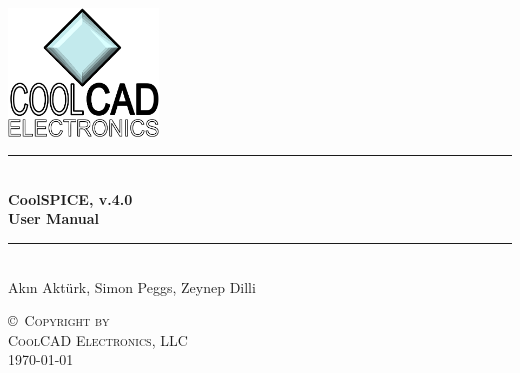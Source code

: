 \begin{titlepage}

\newcommand{\HRule}{\rule{\linewidth}{0.5mm}}
\begin{center}

\includegraphics[width=0.3\textwidth]{./figures/overall_figures/CoolCAD_logo.png}~\\[2.5cm]

\HRule \\[0.4cm]
{ \huge \bfseries CoolSPICE, v.4.0 \\}
{ \huge \bfseries User Manual \\ }
\vspace{0.5cm}
\HRule \\[1.5cm]


\noindent
{\centering 
\Large
Ak{\i}n Akt\"{u}rk, Simon Peggs, Zeynep Dilli}



\vfill

\textsc{\copyright \hbox{ }Copyright by\\ \LARGE  CoolCAD Electronics, LLC}\\[1cm]
{\large \today}


\end{center}
\end{titlepage}